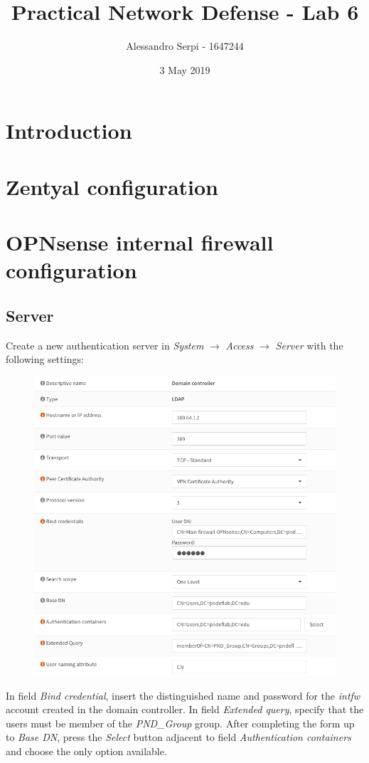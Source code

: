 \documentclass[draft]{homework}
\title{Practical Network Defense - Lab 6}
\author{Alessandro Serpi - 1647244}
\date{3 May 2019}
\newcommand{\opn}{OPNsense\xspace}
\newcommand{\intfw}{\textit{intfw}\xspace}
\begin{document}
    \maketitle
    \tableofcontents
    
    
    \pagebreak
    \section{Introduction}
    
    
    \section{Zentyal configuration}
    
    
    \section{\opn internal firewall configuration}
    \subsection{Server}
    Create a new authentication server in \textit{System} $\rightarrow$ \textit{Access} $\rightarrow$ \textit{Server} with the following settings:
    \begin{figure}[H]
        \centering
        \includegraphics[width=\linewidth]{images/server}
        \label{fig:server}
    \end{figure}
    In field \textit{Bind credential}, insert the distinguished name and password for the \intfw account created in the domain controller.
    In field \textit{Extended query}, specify that the users must be member of the \textit{PND\_Group} group.
    After completing the form up to \textit{Base DN}, press the \textit{Select} button adjacent to field \textit{Authentication containers} and choose the only option available.
    
\end{document}
